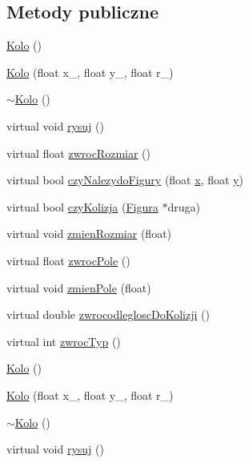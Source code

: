 \subsection*{Metody publiczne}
\begin{DoxyCompactItemize}
\item 
\hyperlink{classKolo_ae2e4cdea681bba2c90d0f5b5782a1a0b}{Kolo} ()
\item 
\hyperlink{classKolo_a4437f43801d28e21c7da14dba1a08b10}{Kolo} (float x\-\_\-, float y\-\_\-, float r\-\_\-)
\item 
\hyperlink{classKolo_adbfca387541fcfa2fa92f1d60b4a1adb}{$\sim$\-Kolo} ()
\item 
virtual void \hyperlink{classKolo_a9d16364f1efacc0b39933a2e9db3a9b8}{rysuj} ()
\item 
virtual float \hyperlink{classKolo_adf2327bc270704e26114bc70dbea76dd}{zwroc\-Rozmiar} ()
\item 
virtual bool \hyperlink{classKolo_ac07eacd65b94fb65ee5a7396e0d291c2}{czy\-Nalezydo\-Figury} (float \hyperlink{classFigura_ad640a05ebb1ddbf595124f0b31793e8a}{x}, float \hyperlink{classFigura_ab17e5953f2898eb729b2dc506640bce2}{y})
\item 
virtual bool \hyperlink{classKolo_a764c248ce1d8a6cbade93abb0b53b45c}{czy\-Kolizja} (\hyperlink{classFigura}{Figura} $\ast$druga)
\item 
virtual void \hyperlink{classKolo_a93c343ba7f2d41c18b4d9a6f9ac23894}{zmien\-Rozmiar} (float)
\item 
virtual float \hyperlink{classKolo_a1b27f5ce6fd9ae25b29025363ef5ff44}{zwroc\-Pole} ()
\item 
virtual void \hyperlink{classKolo_a7bcbafc8534dce8592adca0a146e4a4c}{zmien\-Pole} (float)
\item 
virtual double \hyperlink{classKolo_ac4635854f50604a0cf6f5055f0c20b1f}{zwrocodleglosc\-Do\-Kolizji} ()
\item 
virtual int \hyperlink{classKolo_aa374f8d794a4705b17372c9695e6b5b5}{zwroc\-Typ} ()
\item 
\hyperlink{classKolo_ae2e4cdea681bba2c90d0f5b5782a1a0b}{Kolo} ()
\item 
\hyperlink{classKolo_a4437f43801d28e21c7da14dba1a08b10}{Kolo} (float x\-\_\-, float y\-\_\-, float r\-\_\-)
\item 
\hyperlink{classKolo_adbfca387541fcfa2fa92f1d60b4a1adb}{$\sim$\-Kolo} ()
\item 
virtual void \hyperlink{classKolo_ab39849ea8257405a2c0aa60d138db1ac}{rysuj} ()
\item 

\end{DoxyCompactItemize}
